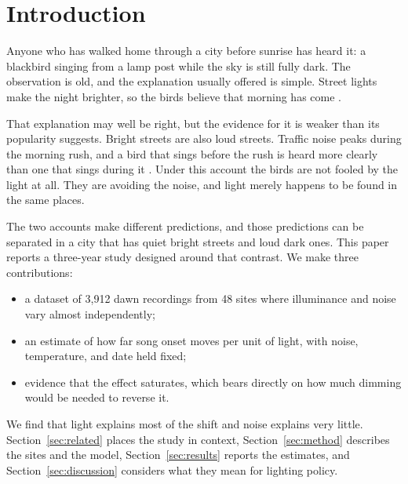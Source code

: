 \section{Introduction}
\label{sec:introduction}

Anyone who has walked home through a city before sunrise has heard it: a blackbird singing from a lamp post while the sky is still fully dark. The observation is old, and the explanation usually offered is simple. Street lights make the night brighter, so the birds believe that morning has come \citep{hartwell2009urban, okafor2015light}.

That explanation may well be right, but the evidence for it is weaker than its popularity suggests. Bright streets are also loud streets. Traffic noise peaks during the morning rush, and a bird that sings before the rush is heard more clearly than one that sings during it \citep{lindqvist2012noise}. Under this account the birds are not fooled by the light at all. They are avoiding the noise, and light merely happens to be found in the same places.

The two accounts make different predictions, and those predictions can be separated in a city that has quiet bright streets and loud dark ones. This paper reports a three-year study designed around that contrast. We make three contributions:
\begin{itemize}
  \item a dataset of 3{,}912 dawn recordings from 48 sites where illuminance and noise vary almost independently;
  \item an estimate of how far song onset moves per unit of light, with noise, temperature, and date held fixed;
  \item evidence that the effect saturates, which bears directly on how much dimming would be needed to reverse it.
\end{itemize}

We find that light explains most of the shift and noise explains very little. Section~\ref{sec:related} places the study in context, Section~\ref{sec:method} describes the sites and the model, Section~\ref{sec:results} reports the estimates, and Section~\ref{sec:discussion} considers what they mean for lighting policy.
